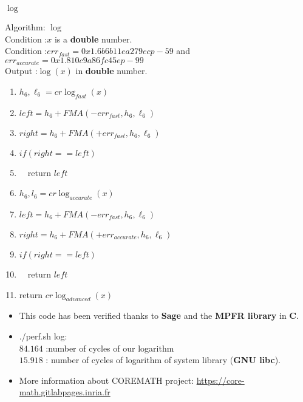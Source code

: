 \begin{frame}{$\log$}
\tiny
 \begin{algo}{Algorithm: $\log$} \\
Condition :$x$ is a \textbf{double} number.\\
Condition :$err_{fast} = 0x1.6b6b11ea279ecp-59$ and $err_{accurate} = 0x1.810c9a86fc45ep-99$\\
Output :$\log(x)$ in \textbf{double} number.
\begin{enumerate}
    \item $h_6,\ell_6 = cr\log_{fast}(x)$ 
\item $left  = h_6 + FMA(-err_{fast}, h_6, \ell_6)$
\item $right = h_6 + FMA(+err_{fast}, h_6, \ell_6)$
\item $if (right== left)$
\item \ \ return $left$
\item $h_6,l_6 = cr\log_{accurate}(x)$
\item $left  = h_6 + FMA(-err_{fast}, h_6, \ell_6)$
\item $right = h_6 + FMA(+err_{accurate}, h_6, \ell_6)$
\item $if (right== left)$\\
\item \ \ return $left$
\item return $cr\log_{advanced}(x)$
\end{enumerate}
\end{algo}   
\end{frame}

\begin{frame}
\begin{itemize}
    \item This code has been verified thanks to \textbf{Sage} and the \textbf{MPFR library} in \textbf{C}.
    \item 
    ./perf.sh log:\\ 
    $84.164$ :number of cycles of our logarithm\\
    $15.918$ : number of cycles of logarithm of system library (\textbf{GNU libc}).
    \item More information about COREMATH project: \url{https://core-math.gitlabpages.inria.fr}
\end{itemize}    
\end{frame}

